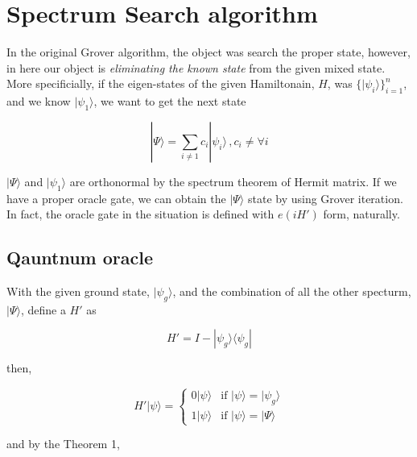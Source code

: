 \documentclass[twocolumn]{article}
\begin{document}

\section{Spectrum Search algorithm}

In the original Grover algorithm, 
the object was search the proper state,
however, in here our object is
\textit{eliminating the known state} from 
the given mixed state.
More specificially, if the eigen-states of the given Hamiltonain, $H$,
was $\{|\psi_i \rangle \}_{i=1}^n$,
and we know $|\psi_1 \rangle$,
we want to get the next state 

\begin{equation}
    |\Psi\rangle = \sum_{i \neq 1} c_i | \psi_i \rangle \, , c_i \neq \forall i
\end{equation}

$|\Psi\rangle$ and $|\psi_1\rangle$ are orthonormal by the spectrum theorem of Hermit matrix.
If we have a proper oracle gate, we can obtain the $|\Psi\rangle$ state by using Grover iteration.
In fact, the oracle gate in the situation is defined with $e(iH')$ form, naturally.

\subsection{Qauntnum oracle}

With the given ground state, $| \psi_g\rangle$, and the combination of all the other 
specturm, $|\Psi \rangle$, define a $H'$ as 

\begin{equation}
    \label{eq:grover_H_def}
    H' = I - | \psi_g \rangle \langle \psi_g|
\end{equation}

then, 

\begin{equation}
    H' |\psi \rangle = \begin{cases}
        0 |\psi \rangle & \text{if }  |\psi \rangle = |\psi_g \rangle\\
        1 |\psi \rangle & \text{if }  |\psi \rangle = |\Psi \rangle
    \end{cases}
\end{equation}

and by the Theorem 1,
\end{document}
